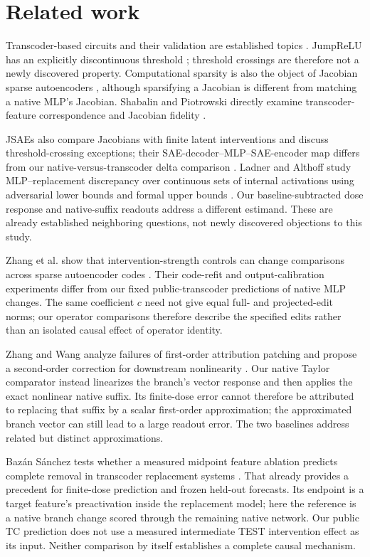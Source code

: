 \section{Related work}
Transcoder-based circuits and their validation are established topics \citep{dunefsky2024,ameisen2025}. JumpReLU has an explicitly discontinuous threshold \citep{rajamanoharan2024}; threshold crossings are therefore not a newly discovered property. Computational sparsity is also the object of Jacobian sparse autoencoders \citep{farnik2025}, although sparsifying a Jacobian is different from matching a native MLP's Jacobian. Shabalin and Piotrowski directly examine transcoder-feature correspondence and Jacobian fidelity \citep{shabalin2026}.

JSAEs also compare Jacobians with finite latent interventions and discuss threshold-crossing exceptions; their SAE-decoder--MLP--SAE-encoder map differs from our native-versus-transcoder delta comparison \citep{farnik2025}. Ladner and Althoff study MLP--replacement discrepancy over continuous sets of internal activations using adversarial lower bounds and formal upper bounds \citep{ladner2026}. Our baseline-subtracted dose response and native-suffix readouts address a different estimand. These are already established neighboring questions, not newly discovered objections to this study.

Zhang et al. show that intervention-strength controls can change comparisons across sparse autoencoder codes \citep{zhang2026}. Their code-refit and output-calibration experiments differ from our fixed public-transcoder predictions of native MLP changes. The same coefficient $c$ need not give equal full- and projected-edit norms; our operator comparisons therefore describe the specified edits rather than an isolated causal effect of operator identity.

Zhang and Wang analyze failures of first-order attribution patching and propose a second-order correction for downstream nonlinearity \citep{zhangwang2026}. Our native Taylor comparator instead linearizes the branch's vector response and then applies the exact nonlinear native suffix. Its finite-dose error cannot therefore be attributed to replacing that suffix by a scalar first-order approximation; the approximated branch vector can still lead to a large readout error. The two baselines address related but distinct approximations.

Baz\'an S\'anchez tests whether a measured midpoint feature ablation predicts complete removal in transcoder replacement systems \citep{bazan2026}. That already provides a precedent for finite-dose prediction and frozen held-out forecasts. Its endpoint is a target feature's preactivation inside the replacement model; here the reference is a native branch change scored through the remaining native network. Our public TC prediction does not use a measured intermediate TEST intervention effect as its input. Neither comparison by itself establishes a complete causal mechanism.

